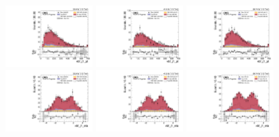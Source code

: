 \begin{figure}[!ht]
  \centering
  \includegraphics[width=0.30\textwidth]{analysis_plots/2016_zv/cr_vjets_l/vbf_j1_pt.pdf}
  \includegraphics[width=0.30\textwidth]{analysis_plots/2017_zv/cr_vjets_l/vbf_j1_pt.pdf}
  \includegraphics[width=0.30\textwidth]{analysis_plots/2018_zv/cr_vjets_l/vbf_j1_pt.pdf} \\
  \includegraphics[width=0.30\textwidth]{analysis_plots/2016_zv/cr_vjets_l/vbf_j1_eta.pdf}
  \includegraphics[width=0.30\textwidth]{analysis_plots/2017_zv/cr_vjets_l/vbf_j1_eta.pdf}
  \includegraphics[width=0.30\textwidth]{analysis_plots/2018_zv/cr_vjets_l/vbf_j1_eta.pdf} \\

\end{figure}
